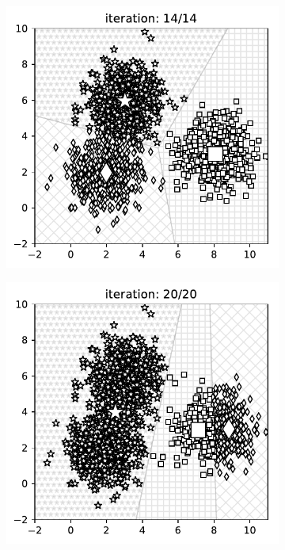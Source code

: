 \begin{itemize}
\begin{figure}[t]
\begin{subfigure}{0.325\textwidth}
\includegraphics[width=0.99\linewidth]{ebookML_src/src/kmeans/dif_res31.pdf}
\caption{}
\label{fig:4_dif_resb}
\end{subfigure}
\begin{subfigure}{0.325\textwidth}
\includegraphics[width=0.99\linewidth]{ebookML_src/src/kmeans/dif_res27.pdf}

\end{subfigure}
\end{figure}
\end{itemize}
